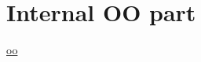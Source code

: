 \section{Internal OO part}



\href{http://ambassadortothecomputers.blogspot.com/2010/03/inside-ocaml-objects.html}{oo}
